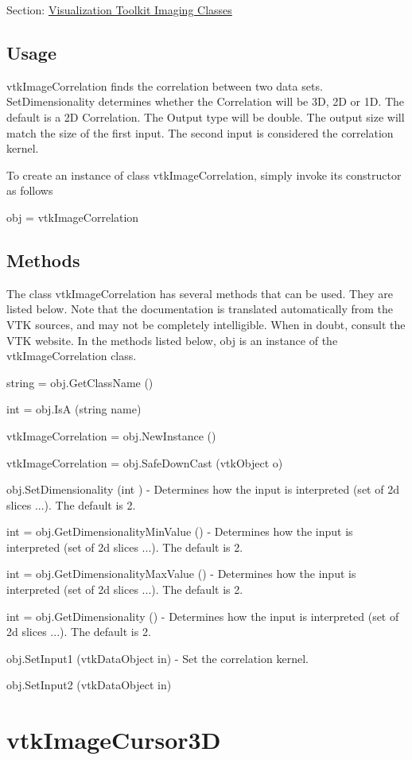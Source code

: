 Section\-: \hyperlink{sec_vtkimaging}{Visualization Toolkit Imaging Classes} \hypertarget{vtkwidgets_vtkxyplotwidget_Usage}{}\subsection{Usage}\label{vtkwidgets_vtkxyplotwidget_Usage}
vtk\-Image\-Correlation finds the correlation between two data sets. Set\-Dimensionality determines whether the Correlation will be 3\-D, 2\-D or 1\-D. The default is a 2\-D Correlation. The Output type will be double. The output size will match the size of the first input. The second input is considered the correlation kernel.

To create an instance of class vtk\-Image\-Correlation, simply invoke its constructor as follows \begin{DoxyVerb}  obj = vtkImageCorrelation
\end{DoxyVerb}
 \hypertarget{vtkwidgets_vtkxyplotwidget_Methods}{}\subsection{Methods}\label{vtkwidgets_vtkxyplotwidget_Methods}
The class vtk\-Image\-Correlation has several methods that can be used. They are listed below. Note that the documentation is translated automatically from the V\-T\-K sources, and may not be completely intelligible. When in doubt, consult the V\-T\-K website. In the methods listed below, {\ttfamily obj} is an instance of the vtk\-Image\-Correlation class. 
\begin{DoxyItemize}
\item {\ttfamily string = obj.\-Get\-Class\-Name ()}  
\item {\ttfamily int = obj.\-Is\-A (string name)}  
\item {\ttfamily vtk\-Image\-Correlation = obj.\-New\-Instance ()}  
\item {\ttfamily vtk\-Image\-Correlation = obj.\-Safe\-Down\-Cast (vtk\-Object o)}  
\item {\ttfamily obj.\-Set\-Dimensionality (int )} -\/ Determines how the input is interpreted (set of 2d slices ...). The default is 2.  
\item {\ttfamily int = obj.\-Get\-Dimensionality\-Min\-Value ()} -\/ Determines how the input is interpreted (set of 2d slices ...). The default is 2.  
\item {\ttfamily int = obj.\-Get\-Dimensionality\-Max\-Value ()} -\/ Determines how the input is interpreted (set of 2d slices ...). The default is 2.  
\item {\ttfamily int = obj.\-Get\-Dimensionality ()} -\/ Determines how the input is interpreted (set of 2d slices ...). The default is 2.  
\item {\ttfamily obj.\-Set\-Input1 (vtk\-Data\-Object in)} -\/ Set the correlation kernel.  
\item {\ttfamily obj.\-Set\-Input2 (vtk\-Data\-Object in)}  
\end{DoxyItemize}\hypertarget{vtkimaging_vtkimagecursor3d}{}\section{vtk\-Image\-Cursor3\-D}\label{vtkimaging_vtkimagecursor3d}
